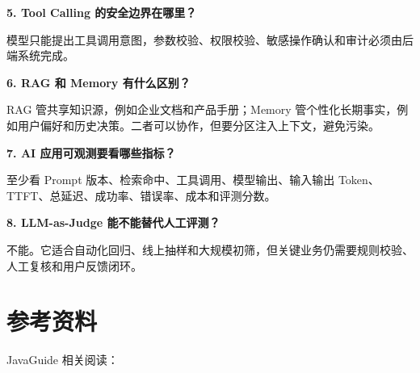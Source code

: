 \documentclass[10pt,a4paper]{ctexart}
\begin{document}
\textbf{5. Tool Calling 的安全边界在哪里？}



模型只能提出工具调用意图，参数校验、权限校验、敏感操作确认和审计必须由后端系统完成。



\textbf{6. RAG 和 Memory 有什么区别？}



RAG 管共享知识源，例如企业文档和产品手册；Memory 管个性化长期事实，例如用户偏好和历史决策。二者可以协作，但要分区注入上下文，避免污染。



\textbf{7. AI 应用可观测要看哪些指标？}



至少看 Prompt 版本、检索命中、工具调用、模型输出、输入输出 Token、TTFT、总延迟、成功率、错误率、成本和评测分数。



\textbf{8. LLM-as-Judge 能不能替代人工评测？}



不能。它适合自动化回归、线上抽样和大规模初筛，但关键业务仍需要规则校验、人工复核和用户反馈闭环。



\section{参考资料}


JavaGuide 相关阅读：
\end{document}
